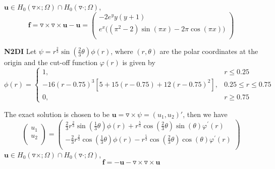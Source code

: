 \documentclass[a4paper,11pt]{article}
\begin{document}
\indent\indent\indent\indent\indent\indent\indent\indent$\mathbf{u}\in H_0(\triangledown\times;\Omega)\cap H_0(\triangledown\cdot;\Omega)$,
\begin{equation}
\mathbf{f} =  \triangledown\times\triangledown\times\mathbf{u}  -\mathbf{u}=
\left( \begin{array}{c}
      -2 e^{y}y(y+1) \\
      e^{x}\big((\pi^2 -2)\sin(\pi x) - 2 \pi \cos(\pi x)\big) \\
\end{array} \right)
\end{equation}

\textbf{N2DI}  Let $\psi = r^{\frac{2}{3}}\sin(\frac{2}{3}\theta)\phi(r)$, where $(r,\theta)$ are the polar coordinates at the origin and the cut-off function $\varphi(r)$ is given by
\begin{equation}
\nonumber
\phi(r) = \left\{\begin{array}{cc}
1,  &  r\leq 0.25 \\
-16(r - 0.75)^3[5 + 15(r - 0.75) + 12(r - 0.75)^2], & 0.25\leq r\leq 0.75\\
0,  &  r\geq 0.75
\end{array}\right.
\end{equation}

The exact solution is chosen to be  $\mathbf{u} = \triangledown\times\psi = (u_1 , u_2)'$, then we have
\begin{equation}
\left( \begin{array}{c}
      u_1 \\
      u_2 \\
\end{array} \right) =
\left( \begin{array}{c}
      \frac{2}{3}r^{\frac{2}{3}}\sin(\frac{1}{3}\theta)\phi(r) + r^{\frac{5}{3}}\cos(\frac{2}{3}\theta)\sin(\theta)\varphi^{'}(r) \\
      - \frac{2}{3}r^{\frac{2}{3}}\cos(\frac{1}{3}\theta)\phi(r) - r^{\frac{5}{3}}\cos(\frac{2}{3}\theta)\cos(\theta)\varphi^{'}(r)  \\
\end{array} \right)
\end{equation}
\indent\indent\indent\indent\indent\indent\indent\indent$\mathbf{u}\in H_0(\triangledown\times;\Omega)\cap H_0(\triangledown\cdot;\Omega)$,
\begin{equation}
\nonumber
\mathbf{f} = -\mathbf{u} - \triangledown\times\triangledown\times\mathbf{u}
\end{equation}
\end{document}
